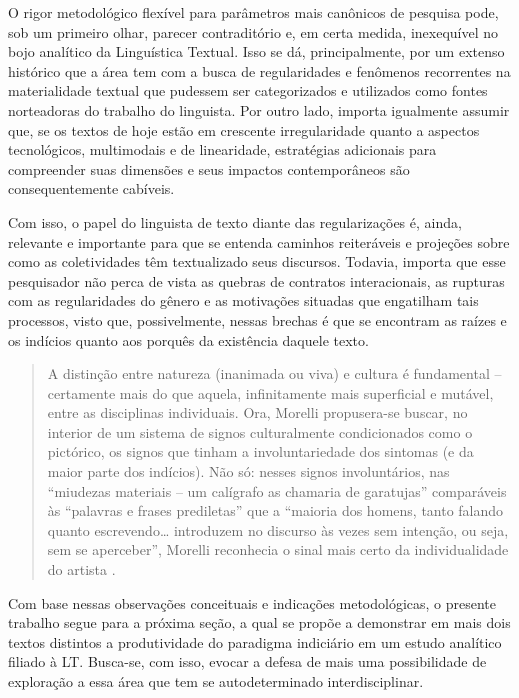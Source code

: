\documentclass[portuguese]{textolivre}
\begin{document}
O rigor metodológico flexível para parâmetros mais canônicos de pesquisa pode, sob um primeiro olhar, parecer contraditório e, em certa medida, inexequível no bojo analítico da Linguística Textual. Isso se dá, principalmente, por um extenso histórico que a área tem com a busca de regularidades e fenômenos recorrentes na materialidade textual que pudessem ser categorizados e utilizados como fontes norteadoras do trabalho do linguista. Por outro lado, importa igualmente assumir que, se os textos de hoje estão em crescente irregularidade quanto a aspectos tecnológicos, multimodais e de linearidade, estratégias adicionais para compreender suas dimensões e seus impactos contemporâneos são consequentemente cabíveis.

Com isso, o papel do linguista de texto diante das regularizações é, ainda, relevante e importante para que se entenda caminhos reiteráveis e projeções sobre como as coletividades têm textualizado seus discursos. Todavia, importa que esse pesquisador não perca de vista as quebras de contratos interacionais, as rupturas com as regularidades do gênero e as motivações situadas que engatilham tais processos, visto que, possivelmente, nessas brechas é que se encontram as raízes e os indícios quanto aos porquês da existência daquele texto.

\begin{quote}
    A distinção entre natureza (inanimada ou viva) e cultura é fundamental – certamente mais do que aquela, infinitamente mais superficial e mutável, entre as disciplinas individuais. Ora, Morelli propusera-se buscar, no interior de um sistema de signos culturalmente condicionados como o pictórico, os signos que tinham a involuntariedade dos sintomas (e da maior parte dos indícios). Não só: nesses signos involuntários, nas “miudezas materiais – um calígrafo as chamaria de garatujas” comparáveis às “palavras e frases prediletas” que a “maioria dos homens, tanto falando quanto escrevendo… introduzem no discurso às vezes sem intenção, ou seja, sem se aperceber”, Morelli reconhecia o sinal mais certo da individualidade do artista \cite[p. 171]{ginzburg1986mitos}.
\end{quote}

Com base nessas observações conceituais e indicações metodológicas, o presente trabalho segue para a próxima seção, a qual se propõe a demonstrar em mais dois textos distintos a produtividade do paradigma indiciário em um estudo analítico filiado à LT. Busca-se, com isso, evocar a defesa de mais uma possibilidade de exploração a essa área que tem se autodeterminado interdisciplinar.
\end{document}
